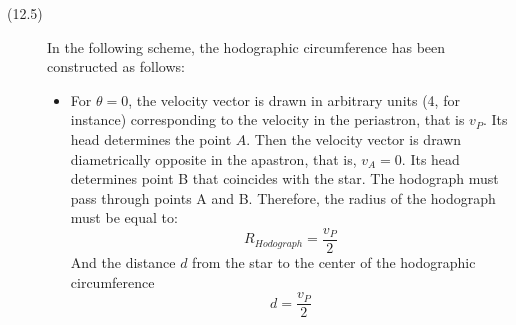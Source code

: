 \begin{description}
\item[(12.5)] In the following scheme, the hodographic circumference has
been constructed as follows:
\begin{itemize}
\item For $\theta = 0$, the velocity vector is drawn in arbitrary units (4,
  for instance) corresponding to the velocity in the periastron, that is
  $v_P$. Its head determines the point $A$. Then the velocity vector is
  drawn diametrically opposite in the apastron, that is, $v_A = 0$. Its head
  determines point B that coincides with the star. The hodograph must pass
  through points A and B. Therefore, the radius of the hodograph must be
  equal to:
\begin{equation*}
R_{Hodograph} = \frac{v_P}{2} \tag*{[1 point]}
\end{equation*}
  And the distance $d$ from the star to the center of the hodographic
  circumference
\begin{equation*}
d = \frac{v_P}{2} \tag*{[1 point]}
\end{equation*}
\end{itemize}
\end{description}


